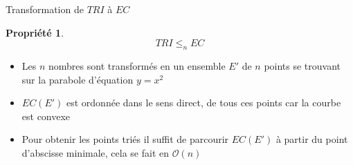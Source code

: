 \documentclass[aspectratio=1610,francais,envcountsect]{beamer}
\newtheorem{property}[theorem]{Propriété}
\begin{document}
\begin{frame}{Transformation de $TRI$ à $EC$}

  \begin{property}
    \begin{equation}
      \label{eq:putri}
      TRI \leq_{n} EC
    \end{equation}
  \end{property}

  \begin{center}
  \end{center}

  \begin{itemize}\small
  \item Les $n$ nombres sont transformés en un ensemble $E'$ de $n$
    points se trouvant sur la parabole d’équation $y = x^2$
  \item $EC(E')$ est ordonnée dans le sens direct, de tous ces points
    car la courbe est convexe
  \item Pour obtenir les points triés il suffit de parcourir $EC(E')$
    à partir du point d’abscisse minimale, cela se fait en
    $\mathcal{O}(n)$
  \end{itemize}

\end{frame}
\end{document}
